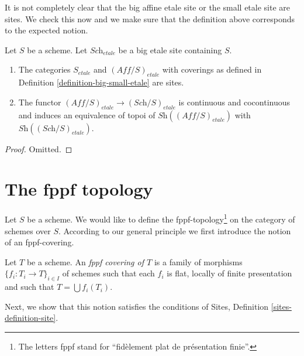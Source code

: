 \noindent
It is not completely clear that
the big affine etale site or the small etale site are sites.
We check this now and we make sure that the definition above corresponds to
the expected notion.

\begin{lemma}
\label{lemma-verify-site-etale}
Let $S$ be a scheme. Let $\textit{Sch}_{etale}$ be a big etale
site containing $S$.
\begin{enumerate}
\item The categories $S_{etale}$ and $(\textit{Aff}/S)_{etale}$ with coverings
as defined in Definition \ref{definition-big-small-etale} are sites.
\item The functor $(\textit{Aff}/S)_{etale} \to (\textit{Sch}/S)_{etale}$
is continuous and cocontinuous and induces an equivalence of topoi of
$\textit{Sh}((\textit{Aff}/S)_{etale})$ with
$\textit{Sh}((\textit{Sch}/S)_{etale})$.
\end{enumerate}
\end{lemma}

\begin{proof}
Omitted.
\end{proof}




















\section{The fppf topology}
\label{section-fppf}

\noindent
Let $S$ be a scheme. We would like to define the fppf-topology\footnote{
The letters fppf stand for ``fid\`element plat de pr\'esentation finie''.} on
the category of schemes over $S$. According to our general principle
we first introduce the notion of an fppf-covering.

\begin{definition}
\label{definition-fppf-covering}
Let $T$ be a scheme. An {\it fppf covering of $T$} is a family
of morphisms $\{f_i : T_i \to T\}_{i \in I}$ of schemes
such that each $f_i$ is flat, locally of finite presentation and such
that $T = \bigcup f_i(T_i)$.
\end{definition}

\noindent
Next, we show that this notion satisfies the conditions of
Sites, Definition \ref{sites-definition-site}.

